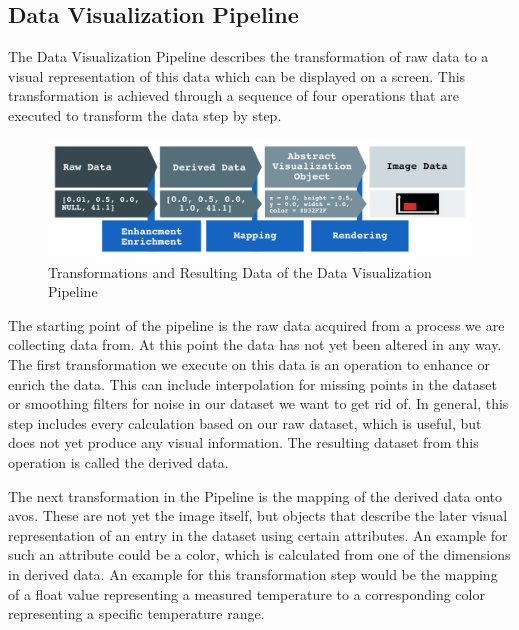 \subsection{Data Visualization Pipeline}
\label{sec:fundamentals:charting:pipeline}

The Data Visualization Pipeline describes the transformation of raw data to a
visual representation of this data which can be displayed on a screen. This
transformation is achieved through a sequence of four operations that are
executed to transform the data step by step. 

\begin{figure}[h]
    \centering
    \includegraphics[width=15cm]{resources/img/VisualizationPipeline}
    \caption{Transformations and Resulting Data of the Data Visualization Pipeline}
    \label{fig:pipeline}
\end{figure}

The starting point of the pipeline is the raw data acquired from a process
we are collecting data from. At this point the data has not yet been altered in
any way. The first transformation we execute on this data is an operation to
enhance or enrich the data. This can include interpolation for missing points in
the dataset or smoothing filters for noise in our dataset we want to get rid of.
In general, this step includes every calculation based on our raw dataset, which
is useful, but does not yet produce any visual information.  The resulting
dataset from this operation is called the derived data. 

The next transformation in the Pipeline is the mapping of the derived data onto
\glspl{avo}. These are not yet the image itself, but objects that describe the
later visual representation of an entry in the dataset using certain attributes.
An example for such an attribute could be a color, which is calculated from one
of the dimensions in derived data. An example for this transformation step would
be the mapping of a float value representing a measured temperature to a
corresponding color representing a specific temperature range.


